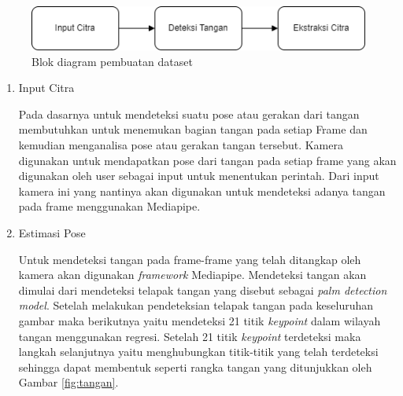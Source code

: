 \begin{figure}[!h]
	\centering
	\includegraphics[width=0.7\linewidth]{gambar/Dataset.png}
	\caption{Blok diagram pembuatan dataset}
	\label{fig:gambar32}
\end{figure}

\begin{enumerate}
  \item Input Citra \par
  Pada dasarnya untuk mendeteksi suatu pose atau gerakan dari tangan membutuhkan untuk menemukan bagian tangan pada setiap Frame dan kemudian menganalisa pose atau gerakan tangan tersebut. Kamera digunakan untuk mendapatkan pose dari tangan pada setiap frame yang akan digunakan oleh user sebagai input untuk menentukan perintah. Dari input kamera ini yang nantinya akan digunakan untuk mendeteksi adanya tangan pada frame menggunakan Mediapipe.
  \item Estimasi Pose \par
  Untuk mendeteksi tangan pada frame-frame yang telah ditangkap oleh kamera akan digunakan \textit{framework} Mediapipe. Mendeteksi tangan akan dimulai dari mendeteksi telapak tangan yang disebut sebagai \textit{palm detection model}. Setelah melakukan pendeteksian telapak tangan pada keseluruhan gambar maka berikutnya yaitu mendeteksi 21 titik \textit{keypoint} dalam wilayah tangan menggunakan regresi. Setelah 21 titik \textit{keypoint} terdeteksi maka langkah selanjutnya yaitu menghubungkan titik-titik yang telah terdeteksi sehingga dapat membentuk seperti rangka tangan yang ditunjukkan oleh Gambar \ref*{fig:tangan}.


\end{enumerate}
